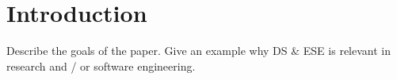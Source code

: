 \section{Introduction}

Describe the goals of the paper.
Give an example why DS \& ESE is relevant in research
and / or software engineering.
